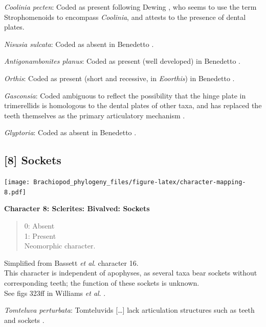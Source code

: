 \documentclass[]{book}
\theoremstyle{definition}
\theoremstyle{definition}
\theoremstyle{definition}
\theoremstyle{remark}
\begin{document}
\emph{Coolinia pecten}: Coded as present following Dewing
\citeyearpar{Dewing2001Hingemodifications}, who seems to use the term
Strophomenoids to encompass \emph{Coolinia}, and attests to the presence
of dental plates.

\emph{Nisusia sulcata}: Coded as absent in Benedetto
\citeyearpar{Benedetto2009iChaniella}.

\emph{Antigonambonites planus}: Coded as present (well developed) in
Benedetto \citeyearpar{Benedetto2009iChaniella}.

\emph{Orthis}: Coded as present (short and recessive, in
\emph{Eoorthis}) in Benedetto \citeyearpar{Benedetto2009iChaniella}.

\emph{Gasconsia}: Coded ambiguous to reflect the possibility that the
hinge plate in trimerellids is homologous to the dental plates of other
taxa, and has replaced the teeth themselves as the primary articulatory
mechanism \citep[see][p.~184, for details of the
articulation]{Williams2000BrachiopodaLinguliformea}.

\emph{Glyptoria}: Coded as absent in Benedetto
\citeyearpar{Benedetto2009iChaniella}.

\hypertarget{sockets}{%
\subsection*{{[}8{]} Sockets}\label{sockets}}

\texttt{[image: Brachiopod\_phylogeny\_files/figure-latex/character-mapping-8.pdf]}

\textbf{Character 8: Sclerites: Bivalved: Sockets}

\begin{quote}
0: Absent\\
1: Present\\
Neomorphic character.
\end{quote}

Simplified from Bassett \emph{et al}.
\citeyearpar{Bassett2001Functionalmorphology} character 16.\\
This character is independent of apophyses, as several taxa bear sockets
without corresponding teeth; the function of these sockets is unknown.\\
See figs 323ff in Williams \emph{et al}.
\citeyearpar{Williams1997BrachiopodaRevised}.

\emph{Tomteluva perturbata}: Tomteluvids {[}\ldots{}{]} lack
articulation structures such as teeth and sockets
\citep{Streng2016Anew}.
\end{document}
